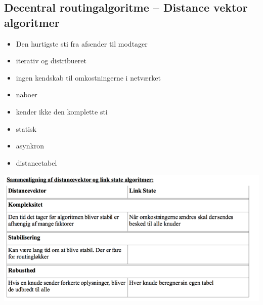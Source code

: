 {{{\subsection{Decentral routingalgoritme – Distance vektor algoritmer}
\begin{itemize}
	\item Den hurtigste sti fra afsender til modtager
	\item iterativ og distribueret
	\item ingen kendskab til omkostningerne i netværket
	\item naboer
	\item kender ikke den komplette sti
	\item statisk
	\item asynkron
	\item distancetabel
\end{itemize}
\begin{center}
  \includegraphics[scale=0.8]{4-network-layer/sammenligning-link-state-distance-vektor.png}
\end{center}


}}}
